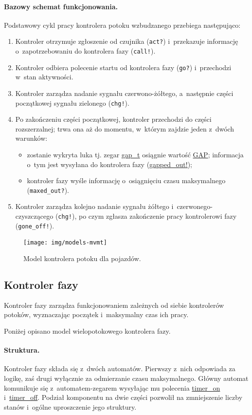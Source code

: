 \documentclass{pracamgr}
\theoremstyle{plain}
\begin{document}
\paragraph{Bazowy schemat funkcjonowania.} Podstawowy cykl pracy
kontrolera potoku wzbudzanego przebiega następująco:
\begin{enumerate}
  \item Kontroler otrzymuje zgłoszenie od czujnika (\texttt{act?}) i~przekazuje
  informację o~zapotrzebowaniu do kontrolera fazy (\texttt{call!}).
  \item Kontroler odbiera polecenie startu od kontrolera fazy
  (\texttt{go?}) i~przechodzi w~stan aktywności.
  \item Kontroler zarządza nadanie sygnału czerwono-żółtego,
  a~następnie części początkowej sygnału zielonego (\texttt{chg!}).
  \item Po zakończeniu części początkowej, kontroler przechodzi do
  części rozszerzalnej; trwa ona aż do momentu, w~którym zajdzie jeden
  z~dwóch warunków:
  \begin{itemize}
    \item zostanie wykryta luka tj. zegar \url{gap_t} osiągnie wartość
    \url{GAP}; informacja o~tym jest wysyłana do kontrolera fazy
    (\url{gapped_out!});
    \item kontroler fazy wyśle informację o~osiągnięciu czasu
    maksymalnego (\texttt{maxed\_out?}).
  \end{itemize}
  \item Kontroler zarządza kolejno nadanie sygnału żółtego
  i~czerwonego-czyszczącego (\texttt{chg!}), po czym zgłasza zakończenie pracy
  kontrolerowi fazy (\texttt{gone\_off!}).
\end{enumerate}

\begin{figure}
  \centering
  \texttt{[image: img/models-mvmt]}
  \caption{Model kontrolera potoku dla pojazdów.}
  \label{img:mvmt-ctrl}
\end{figure}

\subsection{Kontroler fazy}
\label{ss:models:models:phase-ctrl}
Kontroler fazy zarządza funkcjonowaniem zależnych od siebie
kontrolerów potoków, wyznaczając początek i~maksymalny czas ich pracy.

Poniżej opisano model wielopotokowego kontrolera fazy.
\paragraph{Struktura.} Kontroler fazy składa się z~dwóch
automatów. Pierwszy z~nich odpowiada za logikę, zaś drugi wyłącznie za
odmierzanie czasu maksymalnego. Główny automat komunikuje się
z~automatem-zegarem wysyłając mu polecenia \url{timer_on}
i~\url{timer_off}. Podział komponentu na dwie części pozwolił na
zmniejszenie liczby stanów i~ogólne uproszczenie jego struktury.
\end{document}
